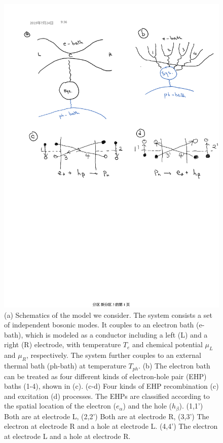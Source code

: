 \documentclass[aps
,twocolumn
,floatfix,footinbib,prl,longbibliography
]{revtex4-1}
\begin{document}
\begin{figure}
	\includegraphics[scale=0.45,angle=0]{schematics-v3.pdf}
	\caption{(a) Schematics of the model we consider. The system consists a set of independent bosonic modes. It couples to an electron bath (e-bath), which is modeled as a conductor including a left (L) and a right (R) electrode, with temperature $T_e$ and chemical potential $\mu_L$ and $\mu_R$, respectively. The system further couples to an external thermal bath (ph-bath) at temperature $T_{ph}$. (b) The electron bath can be treated as four different kinds of electron-hole pair (EHP) baths (1-4), shown in (c). (c-d) Four kinds of EHP recombination (c) and excitation (d) processes. The EHPs are classified according to the spatial location of the electron ($e_\alpha$) and the hole ($h_\beta$). (1,1') Both are at electrode L, (2,2') Both are at electrode R, (3,3') The electron at electrode R and a hole at electrode L. (4,4') The electron at electrode L and a hole at electrode R.}
	\label{fig:ehp}
\end{figure}
\end{document}
